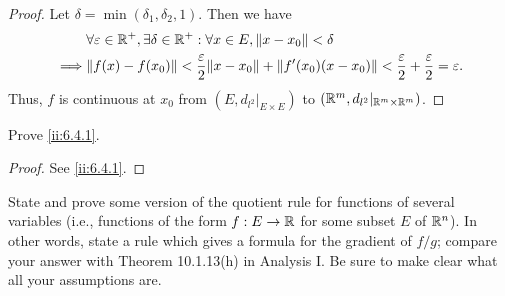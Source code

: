 \begin{proof}
  Let \(\delta = \min(\delta_1, \delta_2, 1)\).
  Then we have
  \begin{align*}
             & \forall \varepsilon \in \R^+, \exists \delta \in \R^+ : \forall x \in E, \norm*{x - x_0} < \delta                                                          \\
    \implies & \norm*{f(x) - f(x_0)} < \dfrac{\varepsilon}{2} \norm*{x - x_0} + \norm*{f'(x_0)(x - x_0)} < \dfrac{\varepsilon}{2} + \dfrac{\varepsilon}{2} = \varepsilon.
  \end{align*}
  Thus, \(f\) is continuous at \(x_0\) from \((E, d_{l^2}|_{E \times E})\) to \((\mathbb{R}^m, d_{l^2}|_{\mathbb{R}^m \times \mathbb{R}^m})\).
\end{proof}

\begin{ex}\label{ii:ex:6.4.3}
  Prove \cref{ii:6.4.1}.
\end{ex}

\begin{proof}
  See \cref{ii:6.4.1}.
\end{proof}

\begin{ex}\label{ii:ex:6.4.4}
  State and prove some version of the quotient rule for functions of several variables (i.e., functions of the form \(f : E \to \mathbb{R}\) for some subset \(E\) of \(\mathbb{R}^n\)).
  In other words, state a rule which gives a formula for the gradient of \(f / g\);
  compare your answer with Theorem 10.1.13(h) in Analysis I.
  Be sure to make clear what all your assumptions are.
\end{ex}

